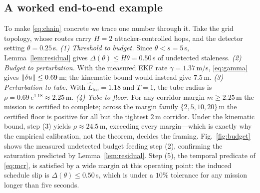 \begin{table}[t]
\centering
\caption{Instantiated constants and their provenance. The one pending numeric
constant is the PAC--Bayes prior/posterior KL, which we flag rather than
substitute.}
\label{tab:constants}
\small
\renewcommand{\arraystretch}{1.15}

\end{table}

\subsection{A worked end-to-end example}
\label{sec:worked}
To make \eqref{eq:chain} concrete we trace one number through it. Take the grid
topology, whose routes carry $H=2$ attacker-controlled hops, and the detector
setting $\theta=0.25$\,s. \emph{(1) Threshold to budget.} Since
$\theta<s=5$\,s, Lemma~\ref{lem:residual} gives $\Delta(\theta)\le H\theta=0.50$\,s
of undetected staleness. \emph{(2) Budget to perturbation.} With the measured
EKF rate $\gamma=1.37$\,m/s, \eqref{eq:gamma} gives
$\left\lVert \delta u\right\rVert\le0.69$\,m; the kinematic bound would instead give $7.5$\,m.
\emph{(3) Perturbation to tube.} With $\hat L_{\mathrm{loc}}=1.18$ and $T=1$,
the tube radius is $\rho=0.69\,e^{1.18}\approx2.25$\,m. \emph{(4) Tube to
floor.} For any corridor margin $m\ge2.25$\,m the mission is certified to
complete; across the margin family $\{2,5,10,20\}$\,m the certified floor is
positive for all but the tightest $2$\,m corridor. Under the kinematic bound,
step (3) yields $\rho\approx24.5$\,m, exceeding every margin---which is exactly
why the empirical calibration, not the theorem, decides the framing.
Fig.~\ref{fig:budget} shows the measured undetected budget feeding step (2),
confirming the saturation predicted by Lemma~\ref{lem:residual}. Step (5), the
temporal predicate of \eqref{eq:mcr}, is satisfied by a wide margin at this
operating point: the induced schedule slip is $\Delta(\theta)\le0.50$\,s, which
is under a $10\%$ tolerance for any mission longer than five seconds.

